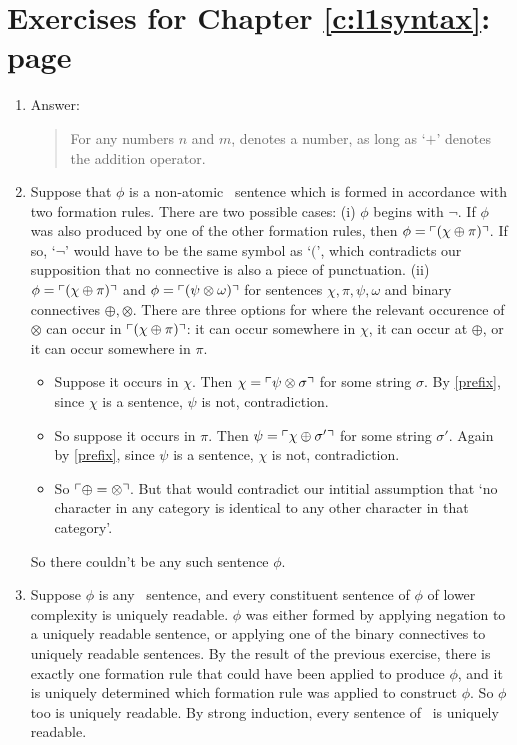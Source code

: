 {\section*{Exercises for Chapter \ref{c:l1syntax}: page \pageref{ex3}} \label{ans3}

\begin{enumerate}
	\item Answer: \begin{quote}
		For any numbers $n$ and $m$,  denotes a number, as long as `$+$' denotes the addition operator.
	\end{quote} \setcounter{enumi}{2}
	\item Suppose that $\phi$ is a non-atomic \lone\ sentence which is formed in accordance with two formation rules. There are two possible cases: (i) $\phi$ begins with $\neg$. If $\phi$ was also produced by one of the other formation rules, then $\phi = \ulcorner (\chi\oplus\pi) \urcorner$. If so, `$\neg$' would have to be the same symbol as `$($', which contradicts our supposition that no connective is also a piece of punctuation. (ii) $\phi = \ulcorner (\chi\oplus\pi) \urcorner$  and $\phi = \ulcorner (\psi\otimes\omega) \urcorner$ for sentences $\chi,\pi,\psi,\omega$ and binary connectives $\oplus,\otimes$. There are three options for where the relevant occurence of $\otimes$ can occur in $\ulcorner (\chi\oplus\pi) \urcorner$: it can occur somewhere in $\chi$, it can occur at $\oplus$, or it can occur somewhere in $\pi$. \begin{itemize}
		\item Suppose it occurs in $\chi$. Then $\chi = \ulcorner \psi\otimes\sigma \urcorner$ for some string $\sigma$. By \autoref{prefix}, since $\chi$ is a sentence, $\psi$ is not, contradiction. 

\item So suppose it occurs in $\pi$. Then $\psi = \ulcorner \chi\oplus\sigma' \urcorner$ for some string $\sigma'$. Again by \autoref{prefix}, since $\psi$ is a sentence, $\chi$ is not, contradiction.
\item So $\ulcorner \oplus=\otimes \urcorner$. But that would contradict our intitial assumption that `no character in any category is identical to any other character in that category'. 
	\end{itemize}
So there couldn't be any such sentence $\phi$.
\item Suppose $\phi$ is any \lone\ sentence, and every constituent sentence of $\phi$ of lower complexity is uniquely readable. $\phi$ was either formed by applying negation to a uniquely readable sentence, or applying one of the binary connectives to uniquely readable sentences. By the result of the previous exercise, there is exactly one formation rule that could have been applied to produce $\phi$, and it is uniquely determined which formation rule was applied to construct $\phi$. So $\phi$ too is uniquely readable.  By strong induction, every sentence of \lone\ is uniquely readable.
		

\end{enumerate}}
